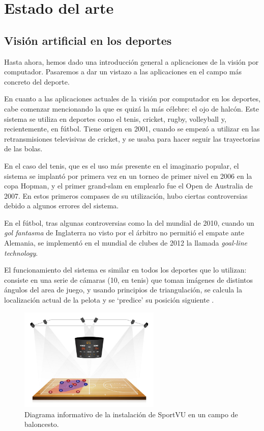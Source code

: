 \section{Estado del arte}


\subsection{Visión artificial en los deportes}
Hasta ahora, hemos dado una introducción general a aplicaciones de la visión por computador. Pasaremos a dar un vistazo a las aplicaciones en el campo más concreto del deporte.

En cuanto a las aplicaciones actuales de la visión por computador en los deportes, cabe comenzar mencionando la que es quizá la más célebre: el ojo de halcón. Este sistema se utiliza en deportes como el tenis, cricket, rugby, volleyball y, recientemente, en fútbol. Tiene origen en 2001, cuando se empezó a utilizar en las retransmisiones televisivas de cricket, y se usaba para hacer seguir las trayectorias de las bolas.

En el caso del tenis, que es el uso más presente en el imaginario popular, el sistema se implantó por primera vez en un torneo de primer nivel en 2006 en la copa Hopman, y el primer grand-slam en emplearlo fue el Open de Australia de 2007. En estos primeros compases de su utilización, hubo ciertas controversias debido a algunos errores del sistema.

En el fútbol, tras algunas controversias como la del mundial de 2010, cuando un \textit{gol fantasma} de Inglaterra no visto por el árbitro no permitió el empate ante Alemania, se implementó en el mundial de clubes de 2012 la llamada \textit{goal-line technology}.

El funcionamiento del sistema es similar en todos los deportes que lo utilizan: consiste en una serie de cámaras (10, en tenis) que toman imágenes de distintos ángulos del area de juego, y usando principios de triangulación, se calcula la localización actual de la pelota y se `predice' su posición siguiente \cite{wiki:hawk}.

\begin{figure}
    \centering
    \includegraphics[width=0.6\textwidth]{images/sportVU}
    \caption{Diagrama informativo de la instalación de SportVU en un campo de baloncesto.}
    \label{fig:sportVU}
\end{figure}

